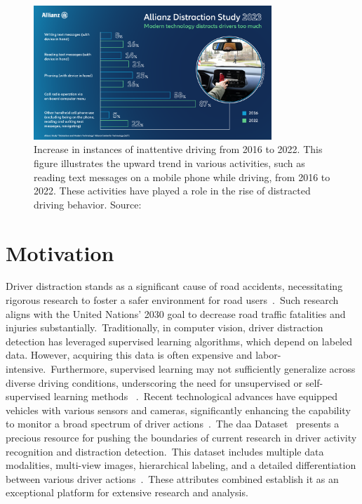 \begin{figure}[h]
\begin{center}
\includegraphics[width=0.8\textwidth]{Images_Thesis/Introduction_Related_Work/allianz-distraction-study-2023-technology-distracts-drivers.png}
\end{center}
\caption[Rise in distracted driving activities from 2016 to 2022]{Increase in instances of inattentive driving from 2016 to 2022. This figure illustrates the upward trend in various activities, such as reading text messages on a mobile phone while driving, from 2016 to 2022. These activities have played a role in the rise of distracted driving behavior. Source:~\citep{study_new_Allianz2023}}
\label{fig:allaianz_dd_2023}
\end{figure}

\section{Motivation}
Driver distraction stands as a significant cause of road accidents, necessitating rigorous research to foster a safer environment for road users~\citep{bing_li_2022new, in_vehicle_cameras_9618784, M1_regan2011driver, M2_young2007driver, moslemi2021computer}.~Such research aligns with the United Nations' 2030 goal to decrease road traffic fatalities and injuries substantially.~Traditionally, in computer vision, driver distraction detection has leveraged supervised learning algorithms, which depend on labeled data. However, acquiring this data is often expensive and labor-intensive.~Furthermore, supervised learning may not sufficiently generalize across diverse driving conditions, underscoring the need for unsupervised or self-supervised learning methods ~\citep{bing_li_2022new}.~Recent technological advances have equipped vehicles with various sensors and cameras, significantly enhancing the capability to monitor a broad spectrum of driver actions~\citet{in_vehicle_cameras_9618784, martin2019drive_and_act_2019_iccv}.~The \gls{daa} Dataset~\citep{martin2019drive_and_act_2019_iccv} presents a precious resource for pushing the boundaries of current research in driver activity recognition and distraction detection.~This dataset includes multiple data modalities, multi-view images, hierarchical labeling, and a detailed differentiation between various driver actions~\citep{martin2019drive_and_act_2019_iccv}.~These attributes combined establish it as an exceptional platform for extensive research and analysis. 

